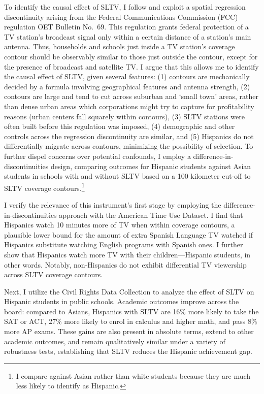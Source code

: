 \documentclass[11pt]{article}
\begin{document}
To identify the causal effect of SLTV, I follow \cite{velez_tuning_2019} and exploit a spatial regression discontinuity arising from the Federal Communications Commission (FCC) regulation OET Bulletin No.~69. This regulation grants federal protection of a TV station’s broadcast signal only within a certain distance of a station’s main antenna. Thus, households and schools just inside a TV station's coverage contour should be observably similar to those just outside the contour, except for the presence of broadcast and satellite TV. I argue that this allows me to identify the causal effect of SLTV, given several features: (1) contours are mechanically decided by a formula involving geographical features and antenna strength, (2) contours are large and tend to cut across suburban and `small town' areas, rather than dense urban areas which corporations might try to capture for profitability reasons (urban centers fall squarely within contours), (3) SLTV stations were often built before this regulation was imposed, (4) demographic and other controls across the regression discontinuity are similar, and (5) Hispanics do not differentially migrate across contours, minimizing the possibility of selection. To further dispel concerns over potential confounds, I employ a difference-in-discontinuities design, comparing outcomes for Hispanic students against Asian students in schools with and without SLTV based on a 100 kilometer cut-off to SLTV coverage contours.\footnote{I compare against Asian rather than white students because they are much less likely to identify as Hispanic.} 

I verify the relevance of this instrument's first stage by employing the difference-in-discontinuities approach with the American Time Use Dataset. I find that Hispanics watch 10 minutes more of TV when within coverage contours, a plausible lower bound for the amount of extra Spanish Language TV watched if Hispanics substitute watching English programs with Spanish ones. I further show that Hispanics watch more TV with their children---Hispanic students, in other words. Notably, non-Hispanics do not exhibit differential TV viewership across SLTV coverage contours.
	
Next, I utilize the Civil Rights Data Collection to analyze the effect of SLTV on Hispanic students in public schools. Academic outcomes improve across the board: compared to Asians, Hispanics with SLTV are 16\% more likely to take the SAT or ACT, 27\% more likely to enrol in calculus and higher math, and pass 8\% more AP exams. These gains are also present in absolute terms, extend to other academic outcomes, and remain qualitatively similar under a variety of robustness tests, establishing that SLTV reduces the Hispanic achievement gap.
\end{document}
